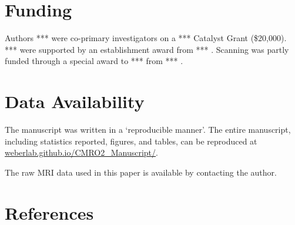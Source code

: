 \documentclass[
  letterpaper,
  DIV=11,
  numbers=noendperiod]{scrartcl}
\begin{document}
\section{Funding}\label{funding}

Authors *** were co-primary investigators on a *** Catalyst Grant
(\$20,000). *** were supported by an establishment award from *** .
Scanning was partly funded through a special award to *** from *** .

\section{Data Availability}\label{data-availability}

The manuscript was written in a `reproducible manner'. The entire
manuscript, including statistics reported, figures, and tables, can be
reproduced at
\href{https://weberlab.github.io/CMRO2_Manuscript/}{weberlab.github.io/CMRO2\_Manuscript/}.

The raw MRI data used in this paper is available by contacting the
author.

\section{References}\label{references}
\end{document}
